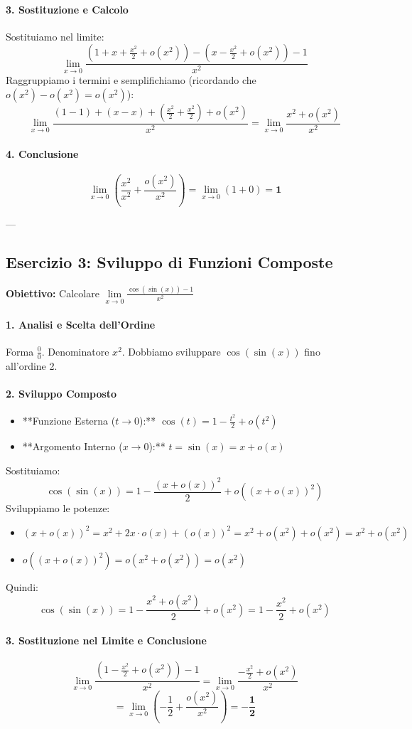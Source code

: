 \paragraph{3. Sostituzione e Calcolo}
Sostituiamo nel limite:
$$ \lim_{x\to 0}\frac{\left(1 + x + \frac{x^2}{2} + o(x^2)\right) - \left(x - \frac{x^2}{2} + o(x^2)\right) - 1}{x^2} $$
Raggruppiamo i termini e semplifichiamo (ricordando che $o(x^2) - o(x^2) = o(x^2)$):
$$ \lim_{x\to 0}\frac{(1 - 1) + (x - x) + \left(\frac{x^2}{2} + \frac{x^2}{2}\right) + o(x^2)}{x^2} = \lim_{x\to 0}\frac{x^2 + o(x^2)}{x^2} $$

\paragraph{4. Conclusione}
$$ \lim_{x\to 0} \left( \frac{x^2}{x^2} + \frac{o(x^2)}{x^2} \right) = \lim_{x\to 0} \left( 1 + 0 \right) = \mathbf{1} $$

---
\subsection{Esercizio 3: Sviluppo di Funzioni Composte}
\begin{example}
\textbf{Obiettivo:} Calcolare $\lim\limits_{x\to 0}\frac{\cos(\sin(x)) - 1}{x^2}$
\end{example}

\paragraph{1. Analisi e Scelta dell'Ordine}
Forma $\frac{0}{0}$. Denominatore $x^2$. Dobbiamo sviluppare $\cos(\sin(x))$ fino all'ordine 2.

\paragraph{2. Sviluppo Composto}
\begin{itemize}
    \item **Funzione Esterna ($t \to 0$):** $\cos(t) = 1 - \frac{t^2}{2} + o(t^2)$
    \item **Argomento Interno ($x \to 0$):** $t = \sin(x) = x + o(x)$
\end{itemize}
Sostituiamo:
$$ \cos(\sin(x)) = 1 - \frac{(x + o(x))^2}{2} + o((x + o(x))^2) $$
Sviluppiamo le potenze:
\begin{itemize}
    \item $(x + o(x))^2 = x^2 + 2x \cdot o(x) + (o(x))^2 = x^2 + o(x^2) + o(x^2) = x^2 + o(x^2)$
    \item $o((x + o(x))^2) = o(x^2 + o(x^2)) = o(x^2)$
\end{itemize}
Quindi:
$$ \cos(\sin(x)) = 1 - \frac{x^2 + o(x^2)}{2} + o(x^2) = 1 - \frac{x^2}{2} + o(x^2) $$

\paragraph{3. Sostituzione nel Limite e Conclusione}
$$ \lim_{x\to 0}\frac{\left(1 - \frac{x^2}{2} + o(x^2)\right) - 1}{x^2} = \lim_{x\to 0}\frac{-\frac{x^2}{2} + o(x^2)}{x^2} $$
$$ = \lim_{x\to 0} \left( -\frac{1}{2} + \frac{o(x^2)}{x^2} \right) = \mathbf{-\frac{1}{2}} $$

% 